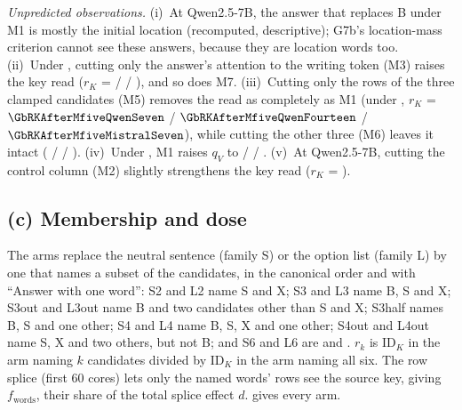 \emph{Unpredicted observations.} (i)~At Qwen2.5-7B, the answer that replaces B under M1 is mostly the initial location (recomputed, descriptive); G7b's location-mass criterion cannot see these answers, because they are location words too. (ii)~Under \fmtPost{}, cutting only the answer's attention to the writing token (M3) raises the key read ($r_K$ = \GbRKPostMthreeQwenSeven{} / \GbRKPostMthreeQwenFourteen{} / \GbRKPostMthreeMistralSeven{}), and so does M7. (iii)~Cutting only the rows of the three clamped candidates (M5) removes the read as completely as M1 (under \fmtListA{}, $r_K$ = $\GbRKAfterMfiveQwenSeven$ / $\GbRKAfterMfiveQwenFourteen$ / $\GbRKAfterMfiveMistralSeven$), while cutting the other three (M6) leaves it intact (\GbRKAfterMsixQwenSeven{} / \GbRKAfterMsixQwenFourteen{} / \GbRKAfterMsixMistralSeven{}). (iv)~Under \fmtPost{}, M1 raises $q_V$ to \GbQVPostMoneQwenSeven{} / \GbQVPostMoneQwenFourteen{} / \GbQVPostMoneMistralSeven{}. (v)~At Qwen2.5-7B, cutting the control column (M2) slightly strengthens the key read ($r_K$ = \GsixRKQwenSeven{}).

\subsection{(c) Membership and dose}\label{app:g-membership}

The arms replace the neutral sentence (family S) or the option list (family L) by one that names a subset of the candidates, in the canonical order and with ``Answer with one word'': S2 and L2 name S and X; S3 and L3 name B, S and X; S3out and L3out name B and two candidates other than S and X; S3half names B, S and one other; S4 and L4 name B, S, X and one other; S4out and L4out name S, X and two others, but not B; and S6 and L6 are \fmtPost{} and \fmtListA{}. $r_k$ is $\mathrm{ID}_K$ in the arm naming $k$ candidates divided by $\mathrm{ID}_K$ in the arm naming all six. The row splice (first 60 cores) lets only the named words' rows see the source key, giving $f_{\mathrm{words}}$, their share of the total splice effect $d$.  gives every arm.

\begin{table}[!ht]
\centering
\small
\caption{\textbf{Membership and dose} (preregistration G, part (c)). Top: $\mathrm{ID}_K$ and $\mathrm{ID}_V$ (nats) per arm, seed-0 cores, $n = 150$. Bottom: row splice ($n = 60$), the share of the total key-swap effect $d$ read by the named words' rows ($f_{\mathrm{words}}$) and by the rows after the question. Qwen2.5-7B, Qwen2.5-14B and Mistral-7B enter G9--G12; OLMo-2-7B and the arms S3half, S4, S4out, L4, L4out, S6, L6 (as splice arms) and S3out, L3out (as splice arms) are exploratory.}
\label{tab:membership}

\end{table}

